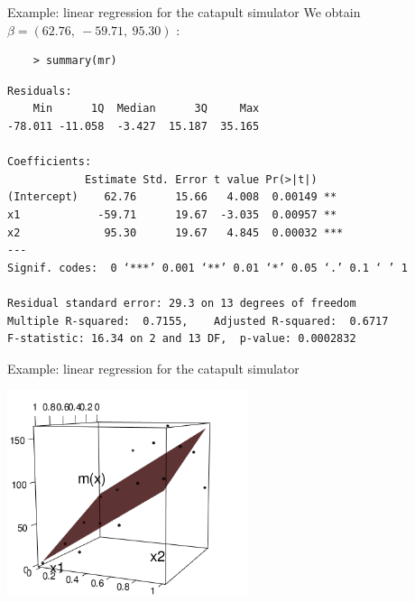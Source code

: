 \documentclass{beamer}
\begin{document}
\begin{frame}[fragile]{}
\begin{exampleblock}{Example: linear regression for the catapult simulator}
We obtain $\beta = (62.76,\ -59.71,\ 95.30 )$ :
\begin{verbatim}
	> summary(mr)
\end{verbatim}
{\footnotesize
\begin{verbatim}
Residuals:
    Min      1Q  Median      3Q     Max 
-78.011 -11.058  -3.427  15.187  35.165 

Coefficients:
            Estimate Std. Error t value Pr(>|t|)    
(Intercept)    62.76      15.66   4.008  0.00149 ** 
x1            -59.71      19.67  -3.035  0.00957 ** 
x2             95.30      19.67   4.845  0.00032 ***
---
Signif. codes:  0 ‘***’ 0.001 ‘**’ 0.01 ‘*’ 0.05 ‘.’ 0.1 ‘ ’ 1

Residual standard error: 29.3 on 13 degrees of freedom
Multiple R-squared:  0.7155,	Adjusted R-squared:  0.6717 
F-statistic: 16.34 on 2 and 13 DF,  p-value: 0.0002832
\end{verbatim}
}
\end{exampleblock}
\end{frame}

\begin{frame}{}
\begin{exampleblock}{Example: linear regression for the catapult simulator}
\begin{center}
\includegraphics[height=6cm]{figures/R/linReg_model.png}
\end{center}
\end{exampleblock}
\end{frame}
\end{document}
